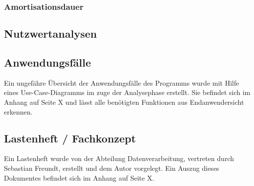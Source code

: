 \subsubsection{Amortisationsdauer}


\subsection{Nutzwertanalysen}

\subsection{Anwendungsfälle}
Ein ungefähre Übersicht der Anwendungsfälle des Programms wurde mit Hilfe eines Use-Case-Diagramms
im zuge der Analysephase erstellt. Sie befindet sich im Anhang auf Seite X und lässt
alle benötigten Funktionen aus Endanwendersicht erkennen.\par

\subsection{Lastenheft / Fachkonzept}
Ein Lastenheft wurde von der Abteilung Datenverarbeitung, vertreten durch Sebastian Freundt,
erstellt und dem Autor vorgelegt. Ein Auszug dieses Dokumentes befindet sich im Anhang auf Seite X.\par






\clearpage